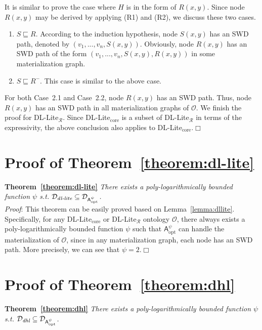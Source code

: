 It is similar to prove the case where $H$ is in the form of $R(x,y)$.
Since node $R(x,y)$ may be derived by
applying (R1) and (R2), we discuss these two cases.

\begin{enumerate}[leftmargin=12ex,label=Case~2.\arabic*]
\item $S\sqsubseteq R$. According to the induction hypothesis,
node $S(x,y)$ has an SWD path, denoted by $(v_1,...,v_n,S(x,y))$.
Obviously, node $R(x,y)$
has an SWD path of the form $(v_1,...,v_n,S(x,y),R(x,y))$
in some materialization graph.

\item $S\sqsubseteq R^-$. This case is similar to
the above case.
\end{enumerate}

For both Case~2.1 and Case~2.2, node $R(x,y)$ has an SWD path. Thus,
node $R(x,y)$ has an SWD path in all materialization graphs of $\mathcal{O}$.
We finish the proof for DL-Lite$_\mathcal{R}$. Since
DL-Lite$_{\text{core}}$ is a subset of DL-Lite$_\mathcal{R}$
in terms of the expressivity, the above conclusion also applies
to DL-Lite$_{\text{core}}$.\hfill$\Box$


\section{Proof of Theorem~\ref{theorem:dl-lite}}

\textbf{Theorem~\ref{theorem:dl-lite}}
\emph{There exists a poly-logarithmically bounded function $\psi$ s.t.
$\mathcal{D}_{\textit{\text{dl-lite}}}\subseteq\mathcal{D}_{\mathsf{A}_{\text{opt}}^{\psi}}$.}\\

\noindent\emph{Proof}: This theorem can be easily proved based on Lemma~\ref{lemma:dllite}.
Specifically, for any DL-Lite$_{\text{core}}$ or DL-Lite$_\mathcal{R}$ ontology $\mathcal{O}$,
there always exists a poly-logarithmically bounded function $\psi$ such that
$\mathsf{A}_{\text{opt}}^{\psi}$ can handle the materialization of $\mathcal{O}$,
since in any materialization graph, each node has an SWD path.
More precisely, we can see that $\psi=2$.\hfill$\Box$


\section{Proof of Theorem~\ref{theorem:dhl}}

\textbf{Theorem~\ref{theorem:dhl}}
\emph{There exists a poly-logarithmically bounded function $\psi$ s.t.
$\mathcal{D}_{\textit{\text{dhl}}}\subseteq\mathcal{D}_{\mathsf{A}_{\text{opt}}^{\psi}}$.}\\

